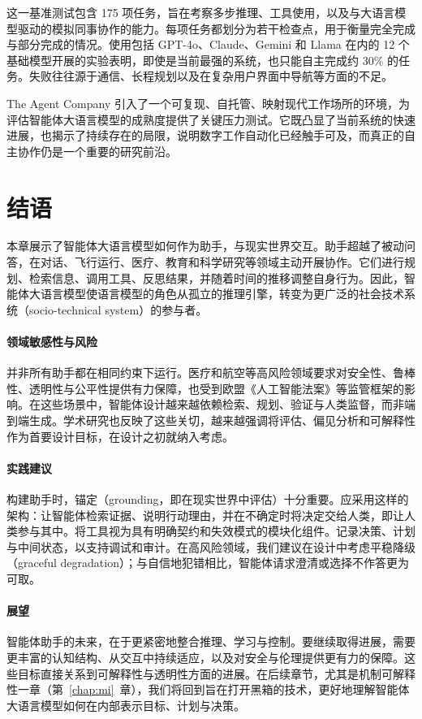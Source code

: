 这一基准测试包含 175 项任务，旨在考察多步推理、工具使用，以及与大语言模型驱动的模拟同事协作的能力。每项任务都划分为若干检查点，用于衡量完全完成与部分完成的情况。使用包括 GPT-4o、Claude、Gemini 和 Llama 在内的 12 个基础模型开展的实验表明，即使是当前最强的系统，也只能自主完成约 30\% 的任务。失败往往源于通信、长程规划以及在复杂用户界面中导航等方面的不足。

The Agent Company 引入了一个可复现、自托管、映射现代工作场所的环境，为评估智能体大语言模型的成熟度提供了关键压力测试。它既凸显了当前系统的快速进展，也揭示了持续存在的局限，说明数字工作自动化已经触手可及，而真正的自主协作仍是一个重要的研究前沿。

\section{结语}

本章展示了智能体大语言模型如何作为助手，与现实世界交互。助手超越了被动问答，在对话、飞行运行、医疗、教育和科学研究等领域主动开展协作。它们进行规划、检索信息、调用工具、反思结果，并随着时间的推移调整自身行为。因此，智能体大语言模型使语言模型的角色从孤立的推理引擎，转变为更广泛的社会技术系统（socio-technical system）的参与者。

\paragraph{领域敏感性与风险}
并非所有助手都在相同约束下运行。医疗和航空等高风险领域要求对安全性、鲁棒性、透明性与公平性提供有力保障，也受到欧盟《人工智能法案》等监管框架的影响。在这些场景中，智能体设计越来越依赖检索、规划、验证与人类监督，而非端到端生成。学术研究也反映了这些关切，越来越强调将评估、偏见分析和可解释性作为首要设计目标，在设计之初就纳入考虑。

\paragraph{实践建议}
构建助手时，锚定（grounding，即在现实世界中评估）十分重要。应采用这样的架构：让智能体检索证据、说明行动理由，并在不确定时将决定交给人类，即让人类参与其中。将工具视为具有明确契约和失效模式的模块化组件。记录决策、计划与中间状态，以支持调试和审计。在高风险领域，我们建议在设计中考虑平稳降级（graceful degradation）；与自信地犯错相比，智能体请求澄清或选择不作答更为可取。

\paragraph{展望}
智能体助手的未来，在于更紧密地整合推理、学习与控制。要继续取得进展，需要更丰富的认知结构、从交互中持续适应，以及对安全与伦理提供更有力的保障。这些目标直接关系到可解释性与透明性方面的进展。在后续章节，尤其是机制可解释性一章（第~\ref{chap:mi}~章），我们将回到旨在打开黑箱的技术，更好地理解智能体大语言模型如何在内部表示目标、计划与决策。



